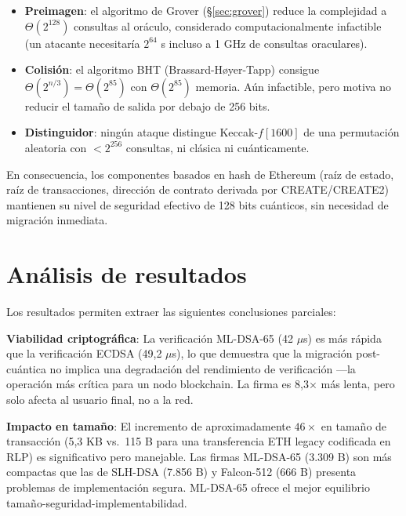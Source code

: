 \begin{itemize}
  \item \textbf{Preimagen}: el algoritmo de Grover (\S\ref{sec:grover}) reduce la complejidad a $\Theta(2^{128})$ consultas al oráculo, considerado computacionalmente infactible (un atacante necesitaría $2^{64}$ s incluso a 1 GHz de consultas oraculares).
  
  \item \textbf{Colisión}: el algoritmo BHT \parencite{brassard1997bht} (Brassard-H\o{}yer-Tapp) consigue $\Theta(2^{n/3}) = \Theta(2^{85})$ con $\Theta(2^{85})$ memoria. Aún infactible, pero motiva no reducir el tamaño de salida por debajo de 256 bits.
  
  \item \textbf{Distinguidor}: ningún ataque distingue Keccak-$f[1600]$ de una permutación aleatoria con $< 2^{256}$ consultas, ni clásica ni cuánticamente.
\end{itemize}

En consecuencia, los componentes basados en hash de Ethereum (raíz de estado, raíz de transacciones, dirección de contrato derivada por CREATE/CREATE2) mantienen su nivel de seguridad efectivo de 128 bits cuánticos, sin necesidad de migración inmediata.


\section{Análisis de resultados}
\label{sec:res_analysis}

Los resultados permiten extraer las siguientes conclusiones parciales:

\textbf{Viabilidad criptográfica}: La verificación ML-DSA-65 (42 $\mu$s) es más rápida que la verificación ECDSA (49,2 $\mu$s), lo que demuestra que la migración post-cuántica no implica una degradación del rendimiento de verificación ---la operación más crítica para un nodo blockchain. La firma es 8,3$\times$ más lenta, pero solo afecta al usuario final, no a la red.

\textbf{Impacto en tamaño}: El incremento de aproximadamente $46\times$ en tamaño de transacción (5{,}3 KB vs.\ 115 B para una transferencia ETH legacy codificada en RLP) es significativo pero manejable. Las firmas ML-DSA-65 (3.309 B) son más compactas que las de SLH-DSA (7.856 B) y Falcon-512 (666 B) presenta problemas de implementación segura. ML-DSA-65 ofrece el mejor equilibrio tamaño-seguridad-implementabilidad.

